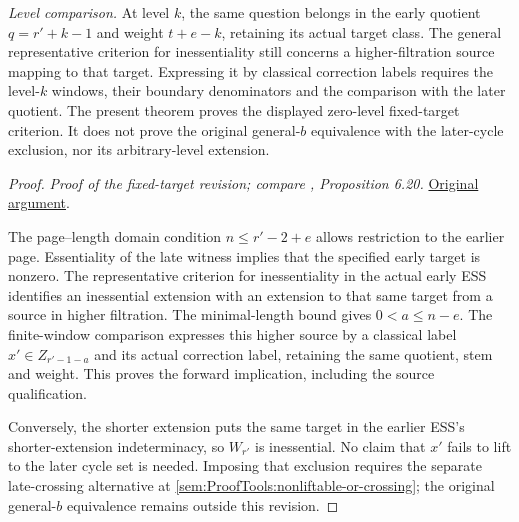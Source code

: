 \begin{proposition}
\textit{Level comparison.}
At level $k$, the same question belongs in the early quotient
$q=r'+k-1$ and weight $t+e-k$, retaining its actual target class.
The general representative criterion for inessentiality still concerns
a higher-filtration source mapping to that target. Expressing it by
classical correction labels requires the level-$k$ windows, their
boundary denominators and the comparison with the later quotient.
The present theorem proves the displayed zero-level fixed-target
criterion. It does not prove the original general-$b$ equivalence
with the later-cycle exclusion, nor its arbitrary-level extension.
\end{proposition}
\begin{proof}
\textit{Proof of the fixed-target revision; compare \cite{LWX126}, Proposition 6.20.} \href{paper/main.tex.html#L1995}{Original argument}.

The page--length domain condition $n\le r'-2+e$ allows restriction to the earlier page. Essentiality of the late witness implies that the specified early target is nonzero. The representative criterion for inessentiality in the actual early ESS identifies an inessential extension with an extension to that same target from a source in higher filtration. The minimal-length bound gives $0<a\le n-e$. The finite-window comparison expresses this higher source by a classical label $x'\in Z_{r'-1-a}$ and its actual correction label, retaining the same quotient, stem and weight. This proves the forward implication, including the source qualification.

Conversely, the shorter extension puts the same target in the earlier ESS's shorter-extension indeterminacy, so $W_{r'}$ is inessential. No claim that $x'$ fails to lift to the later cycle set is needed. Imposing that exclusion requires the separate late-crossing alternative at \ref{sem:ProofTools:nonliftable-or-crossing}; the original general-$b$ equivalence remains outside this revision.
\end{proof}

